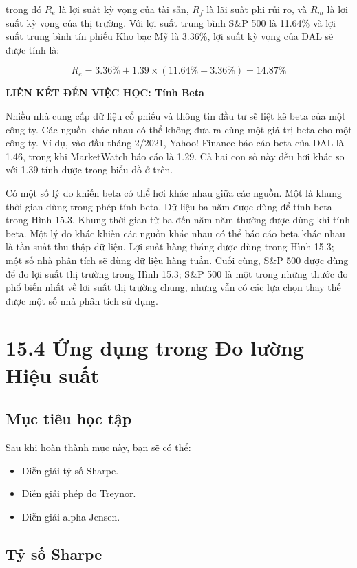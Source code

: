trong đó $R_e$ là lợi suất kỳ vọng của tài sản, $R_f$ là lãi suất phi rủi ro, và $R_m$ là lợi suất kỳ vọng của thị trường. Với lợi suất trung bình S\&P 500 là 11.64\% và lợi suất trung bình tín phiếu Kho bạc Mỹ là 3.36\%, lợi suất kỳ vọng của DAL sẽ được tính là:

$$
R_e = 3.36\% + 1.39 \times (11.64\% - 3.36\%) = 14.87\%
$$

\begin{framed}
\textbf{LIÊN KẾT ĐẾN VIỆC HỌC: Tính Beta}

Nhiều nhà cung cấp dữ liệu cổ phiếu và thông tin đầu tư sẽ liệt kê beta của một công ty. Các nguồn khác nhau có thể không đưa ra cùng một giá trị beta cho một công ty. Ví dụ, vào đầu tháng 2/2021, Yahoo! Finance báo cáo beta của DAL là 1.46, trong khi MarketWatch báo cáo là 1.29. Cả hai con số này đều hơi khác so với 1.39 tính được trong biểu đồ ở trên.

Có một số lý do khiến beta có thể hơi khác nhau giữa các nguồn. Một là khung thời gian dùng trong phép tính beta. Dữ liệu ba năm được dùng để tính beta trong Hình 15.3. Khung thời gian từ ba đến năm năm thường được dùng khi tính beta. Một lý do khác khiến các nguồn khác nhau có thể báo cáo beta khác nhau là tần suất thu thập dữ liệu. Lợi suất hàng tháng được dùng trong Hình 15.3; một số nhà phân tích sẽ dùng dữ liệu hàng tuần. Cuối cùng, S\&P 500 được dùng để đo lợi suất thị trường trong Hình 15.3; S\&P 500 là một trong những thước đo phổ biến nhất về lợi suất thị trường chung, nhưng vẫn có các lựa chọn thay thế được một số nhà phân tích sử dụng.
\end{framed}

\section{15.4 Ứng dụng trong Đo lường Hiệu suất}

\subsection*{Mục tiêu học tập}
Sau khi hoàn thành mục này, bạn sẽ có thể:
\begin{itemize}
  \item Diễn giải tỷ số Sharpe.
  \item Diễn giải phép đo Treynor.
  \item Diễn giải alpha Jensen.
\end{itemize}

\subsection*{Tỷ số Sharpe}


